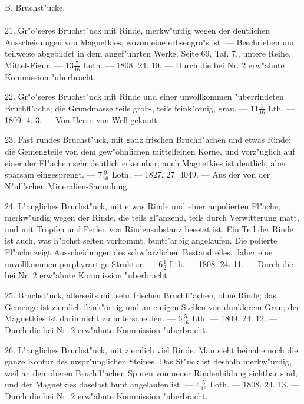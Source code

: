 \documentclass[a4paper, 11pt, oneside, polutonikogreek, german]{article}
\begin{document}
\begin{center}
B. Bruchst"ucke.
\end{center}
\paragraph{}
21. Gr"o"seres Bruchst"uck mit Rinde, merkw"urdig wegen der deutlichen Ausscheidungen von Magnetkies, wovon eine erbsengro"s ist. --- Beschrieben und teilweise abgebildet in dem angef"uhrten Werke, Seite 69, Taf. 7., untere Reihe, Mittel-Figur. --- $\mathfrak{13\frac{7}{16}}$ Loth. --- 1808. 24. 10. --- Durch die bei Nr. 2 erw"ahnte Kommission "uberbracht.

22. Gr"o"seres Bruchst"uck mit Rinde und einer unvollkommen "uberrindeten Bruchfl"ache; die Grundmasse teils grob-, teils feink"ornig, grau. --- $\mathfrak{11\frac{1}{16}}$ Lth. --- 1809. 4. 3. --- Von Herrn von Well gekauft.

23. Fast rundes Bruchst"uck, mit ganz frischen Bruchfl"achen und etwas Rinde; die Gemengteile von dem gew"ohnlichen mittelfeinen Korne, und vorz"uglich auf einer der Fl"achen sehr deutlich erkennbar; auch Magnetkies ist deutlich, aber sparsam eingesprengt. --- $\mathfrak{7\frac{9}{16}}$ Loth. --- 1827. 27. 4049. --- Aus der von der N"ull’schen Mineralien-Sammlung.

24. L"angliches Bruchst"uck, mit etwas Rinde und einer anpolierten Fl"ache; merkw"urdig wegen der Rinde, die teils gl"anzend, teils durch Verwitterung matt, und mit Tropfen und Perlen von Rindensubstanz besetzt ist. Ein Teil der Rinde ist auch, was h"ochst selten vorkommt, buntf"arbig angelaufen. Die polierte Fl"ache zeigt Ausscheidungen des schw"arzlichen Bestandteiles, daher eine unvollkommen porphyrartige Struktur. --- $\mathfrak{6\frac{1}{2}}$ Lth. --- 1808. 24. 11. --- Durch die bei Nr. 2 erw"ahnte Kommission "uberbracht.

25. Bruchst"uck, allerseits mit sehr frischen Bruchfl"achen, ohne Rinde; das Gemenge ist ziemlich feink"ornig und an einigen Stellen von dunklerem Grau; der Magnetkies ist darin nicht zu unterscheiden. --- $\mathfrak{6\frac{5}{16}}$ Lth. --- 1809. 24. 12. --- Durch die bei Nr. 2 erw"ahnte Kommission "uberbracht.

26. L"angliches Bruchst"uck, mit ziemlich viel Rinde. Man sieht beinahe noch die ganze Kontur des urspr"unglichen Steines. Das St"uck ist deshalb merkw"urdig, weil an den oberen Bruchfl"achen Spuren von neuer Rindenbildung sichtbar sind, und der Magnetkies daselbst bunt angelaufen ist. --- $\mathfrak{4\frac{5}{16}}$ Loth. --- 1808. 24. 13. --- Durch die bei Nr. 2 erw"ahnte Kommission "uberbracht.
\end{document}
